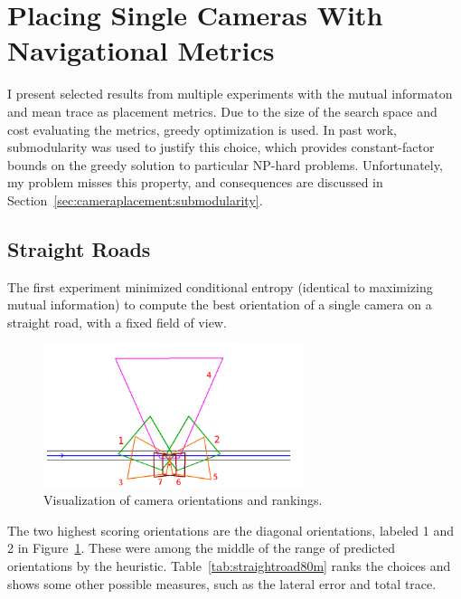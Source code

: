 \documentclass[a4paper,12pt,twoside,openright]{report}
\begin{document}
\section{Placing Single Cameras With Navigational Metrics}
\label{sec:placement:nav}
I present selected results from multiple experiments with the mutual informaton
and mean trace as placement metrics. Due to the size of the search space and cost 
evaluating the metrics, greedy optimization is used. In past work, submodularity was
used to justify this choice, which provides constant-factor bounds 
on the greedy solution to particular NP-hard problems. Unfortunately, my problem
misses this property, and consequences are discussed in Section~\ref{sec:cameraplacement:submodularity}.

\subsection{Straight Roads}

The first experiment minimized conditional entropy (identical to maximizing mutual information)
to compute the best orientation of a single camera on a straight road, with a fixed field of view.

\begin{figure}[htb]
    \centering
    \includegraphics[width=3in]{figures/straightroad_80m_singlecamera.png}
    \caption[Single Camera Optimization Using MI]{Visualization of camera orientations and rankings.}
    \label{fig:miplacement:straightroad80m}
\end{figure}


The two highest scoring orientations are the diagonal orientations, labeled 1 and 2 in Figure~\ref{fig:miplacement:straightroad80m}.
These were among the middle of the range of predicted orientations by the heuristic.
Table~\ref{tab:straightroad80m} ranks the choices and shows some other possible measures,
such as the lateral error and total trace. 
\end{document}
